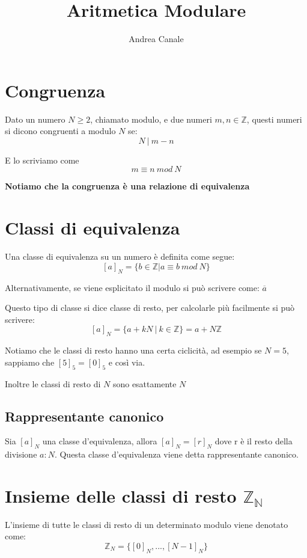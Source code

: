 \documentclass[a4paper, 10pt]{article}
\title{Aritmetica Modulare}
\author{Andrea Canale}
\begin{document}
	\maketitle
	\tableofcontents
	
\section{Congruenza}

Dato un numero $N \geq 2$, chiamato modulo, e due numeri $m,n \in \mathbb{Z}$, questi numeri si dicono congruenti a modulo $N$ se:
$$N\ |\ m - n$$

E lo scriviamo come $$m \equiv n\ mod\ N$$

\textbf{Notiamo che la congruenza è una relazione di equivalenza}

\section{Classi di equivalenza}

Una classe di equivalenza su un numero è definita come segue:
$$[a]_N=\{b \in \mathbb{Z} | a \equiv b\ mod\ N \}$$

Alternativamente, se viene esplicitato il modulo si può scrivere come: $\overline{a}$

Questo tipo di classe si dice classe di resto, per calcolarle più facilmente si può scrivere: 
$$[a]_N = \{a + kN\ |\ k \in \mathbb{Z}\} = a + N\mathbb{Z}$$

Notiamo che le classi di resto hanno una certa ciclicità, ad esempio se $N=5$, sappiamo che $[5]_5 = [0]_5$ e così via.

Inoltre le classi di resto di $N$ sono esattamente $N$

\subsection{Rappresentante canonico}

Sia $[a]_N$ una classe d'equivalenza, allora $[a]_N = [r]_N$ dove r è il resto della divisione $a:N$. Questa classe d'equivalenza viene detta rappresentante canonico.

\section{Insieme delle classi di resto $\mathbb{Z_N}$}

L'insieme di tutte le classi di resto di un determinato modulo viene denotato come: $$\mathbb{Z}_N = \{[0]_N, ..., [N-1]_N\}$$
\end{document}
